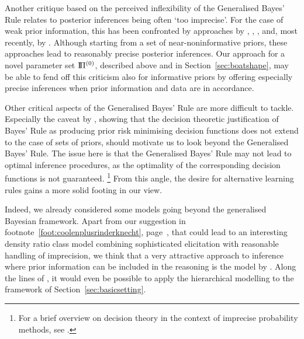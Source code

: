 Another critique based on the perceived inflexibility of the Generalised Bayes' Rule
relates to posterior inferences being often `too imprecise'.
For the case of weak prior information, this has been confronted
by approaches by \textcite{1996:walley::idm}, \textcite{2009:bickis}, \textcite{2012:benavolizaffalon},
and, most recently, by \textcite{2013:mangilibenavoli}.
Although starting from a set of near-noninformative priors, %
these approaches lead to reasonably precise posterior inferences.
Our approach for a novel parameter set $\text{I}\!\Pi^{(0)}$, %
described above and in Section~\ref{sec:boatshape},
may be able to fend off this criticism also for informative priors by
offering especially precise inferences when prior information and data are in accordance.

Other critical aspects of the Generalised Bayes' Rule are more difficult to tackle.
Especially the caveat by \textcite{2003:augustin},
showing that the decision theoretic justification of Bayes' Rule
as producing prior risk minimising decision functions does not extend to the case of sets of priors,
should motivate us to look beyond the Generalised Bayes' Rule.
The issue here is that the Generalised Bayes' Rule
may not lead to optimal inference procedures,
as the optimality of the corresponding decision functions is not guaranteed.%
\footnote{For a brief overview on decision theory in the context of imprecise probability methods, see \textcite{itip-decision}.}
From this angle, the desire for alternative learning rules
gains a more solid footing in our view.

Indeed, we already considered some models going beyond the generalised Bayesian framework.
Apart from our suggestion in footnote~\ref{foot:coolenplusrinderknecht}, page~\pageref{foot:coolenplusrinderknecht},
that could lead to an interesting density ratio class model combining sophisticated elicitation with reasonable handling of imprecision,
we think that a very attractive approach to inference where prior information can be included in the reasoning
is the model by \textcite[see Section~\ref{sec:hierarchical}]{2008:cattaneo}.
Along the lines of \textcite{2011:4:isipta},
it would even be possible to apply the hierarchical modelling to the framework of Section~\ref{sec:basicsetting}.

